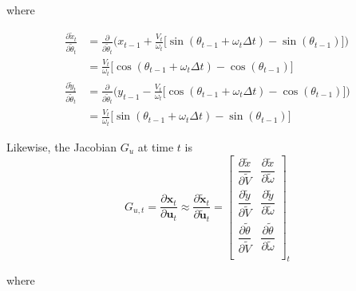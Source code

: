 \documentclass{article}
\begin{document}
\begin{enumerate}[label=(\roman*)]
where

\begin{equation}
\begin{aligned}
\frac{\partial \tilde x_t}{\partial \tilde \theta_t}
&= \frac{\partial}{\partial \tilde \theta_t} \Bigg( x_{t-1} + \frac{V_t}{\omega_t} \Big[ \sin(\theta_{t-1} + \omega_t\Delta t) - \sin(\theta_{t-1}) \Big] \Bigg) \\
&= \frac{V_t}{\omega_t} \Big[ \cos(\theta_{t-1} + \omega_t \Delta t) - \cos(\theta_{t-1}) \Big] \\
\frac{\partial \tilde y_t}{\partial \tilde \theta_t}
&= \frac{\partial}{\partial \tilde \theta_t} \Bigg( y_{t-1} - \frac{V_t}{\omega_t} \Big[ \cos(\theta_{t-1} + \omega_t\Delta t) - \cos(\theta_{t-1}) \Big] \Bigg) \\
&= \frac{V_t}{\omega_t} \Big[ \sin(\theta_{t-1} + \omega_t \Delta t) - \sin(\theta_{t-1}) \Big]
\end{aligned}
\end{equation}

Likewise, the Jacobian $G_u$ at time $t$ is
\begin{equation}
G_{u,t}
= \frac{\partial \mathbf{x}_t}{\partial \mathbf{u}_t}
\approx \frac{\partial \tilde{\mathbf{x}}_t}{\partial \tilde{\mathbf{u}}_t}
= \begin{bmatrix}
\dfrac{\partial \tilde x}{\partial \tilde V} & \dfrac{\partial \tilde x}{\partial \tilde \omega} \\[6pt]
\dfrac{\partial \tilde y}{\partial \tilde V} & \dfrac{\partial \tilde y}{\partial \tilde \omega} \\[6pt]
\dfrac{\partial \tilde \theta}{\partial \tilde V} & \dfrac{\partial \tilde \theta}{\partial \tilde \omega} \\
\end{bmatrix}_t
\end{equation}

where


\end{enumerate}
\end{document}
